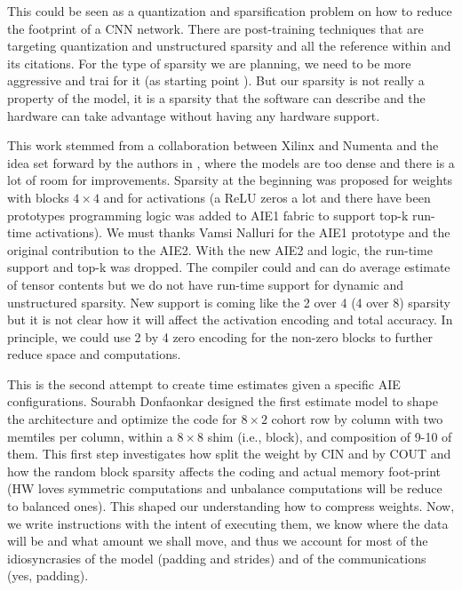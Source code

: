 \documentclass[conference]{IEEEtran}
\begin{document}
This could be seen as a quantization and sparsification problem on how
to reduce the footprint of a CNN network. There are post-training
techniques that are targeting quantization and unstructured sparsity
\cite{frantar2023gptq} and all the reference within and its
citations. For the type of sparsity we are planning, we need to be
more aggressive and trai for it (as starting point
\cite{abs-2102-11289}).  But our sparsity is not really a property of
the model, it is a sparsity that the software can describe and the
hardware can take advantage without having any hardware support.

This work stemmed from a collaboration between Xilinx and Numenta and
the idea set forward by the authors in \cite{ahmad2019dense}, where
the models are too dense and there is a lot of room for
improvements. Sparsity at the beginning was proposed for weights with
blocks $4\times 4$ and for activations (a ReLU zeros a lot and there
have been prototypes programming logic was added to AIE1 fabric to
support top-k run-time activations). We must thanks Vamsi Nalluri for
the AIE1 prototype and the original contribution to the AIE2. With the
new AIE2 and logic, the run-time support and top-k was dropped. The
compiler could and can do average estimate of tensor contents but we
do not have run-time support for dynamic and unstructured
sparsity. New support is coming like the 2 over 4 (4 over 8) sparsity
but it is not clear how it will affect the activation encoding and
total accuracy. In principle, we could use 2 by 4 zero encoding for
the non-zero blocks to further reduce space and computations.

This is the second attempt to create time estimates given a specific
AIE configurations. Sourabh Donfaonkar designed the first estimate
model to shape the architecture and optimize the code for $8\times 2$
cohort row by column with two memtiles per column, within a $8\times
8$ shim (i.e., block), and composition of 9-10 of them. This first
step investigates how split the weight by CIN and by COUT and how the
random block sparsity affects the coding and actual memory foot-print
(HW loves symmetric computations and unbalance computations will
be reduce to balanced ones). This shaped our understanding how to
compress weights. Now, we write instructions with the intent of
executing them, we know where the data will be and what amount we
shall move, and thus we account for most of the idiosyncrasies of the
model (padding and strides) and of the communications (yes, padding).
\end{document}
